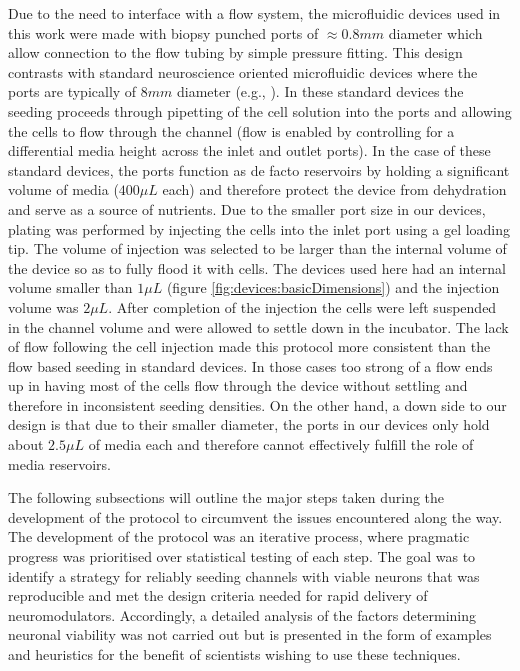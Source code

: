     Due to the need to interface with a flow system, the microfluidic devices used in this work were made with biopsy punched ports of \(\approx 0.8 mm\) diameter which allow connection to the flow tubing by simple pressure fitting. This design contrasts with standard neuroscience oriented microfluidic devices where the ports are typically of \(8 mm\) diameter (e.g., \cite{park2006microfluidic,robertson2014chemically,millet2007microfluidic}). In these standard devices the seeding proceeds through pipetting of the cell solution into the ports and allowing the cells to flow through the channel (flow is enabled by controlling for a differential media height across the inlet and outlet ports). In the case of these standard devices, the ports function as de facto reservoirs by holding a significant volume of media (\(400 \mu L\) each) and therefore protect the device from dehydration and serve as a source of nutrients. Due to the smaller port size in our devices, plating was performed by injecting the cells into the inlet port using a gel loading tip. The volume of injection was selected to be larger than the internal volume of the device so as to fully flood it with cells. The devices used here had an internal volume smaller than \(1 \mu L\) (figure \ref{fig:devices:basicDimensions}) and the injection volume was \(2 \mu L\). After completion of the injection the cells were left suspended in the channel volume and were allowed to settle down in the incubator. The lack of flow following the cell injection made this protocol more consistent than the flow based seeding in standard devices. In those cases too strong of a flow ends up in having most of the cells flow through the device without settling and therefore in inconsistent seeding densities. On the other hand, a down side to our design is that due to their smaller diameter, the ports in our devices only hold about \(2.5 \mu L\) of media each and therefore cannot effectively fulfill the role of media reservoirs.

    The following subsections will outline the major steps taken during the development of the protocol to circumvent the issues encountered along the way. The development of the protocol was an iterative process, where pragmatic progress was prioritised over statistical testing of each step. The goal was to identify a strategy for reliably seeding channels with viable neurons that was reproducible and met the design criteria needed for rapid delivery of neuromodulators. Accordingly, a detailed analysis of the factors determining neuronal viability was not carried out but is presented in the form of examples and heuristics for the benefit of scientists wishing to use these techniques.

